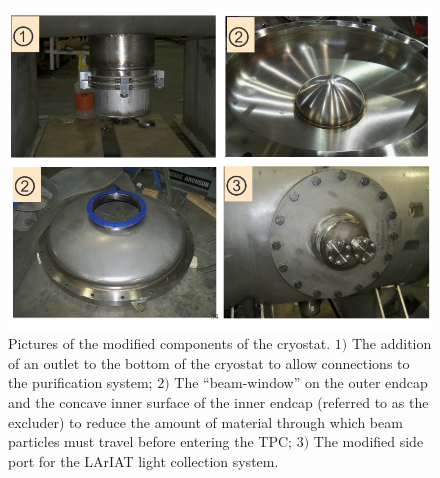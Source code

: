 \begin{figure}[htb]
\centering
\includegraphics[scale=0.35]{Chapter-3/Images/CryoMods.png}
\caption{Pictures of the modified components of the cryostat. $1)$ The addition of an outlet to the bottom of the cryostat to allow connections to the purification system; $2)$ The ``beam-window'' on the outer endcap and the concave inner surface of the inner endcap (referred to as the excluder) to reduce the amount of material through which beam particles must travel before entering the TPC; $3)$ The modified side port for the LArIAT light collection system.}
\label{fig:LArIATCryoMods}
\end{figure}

